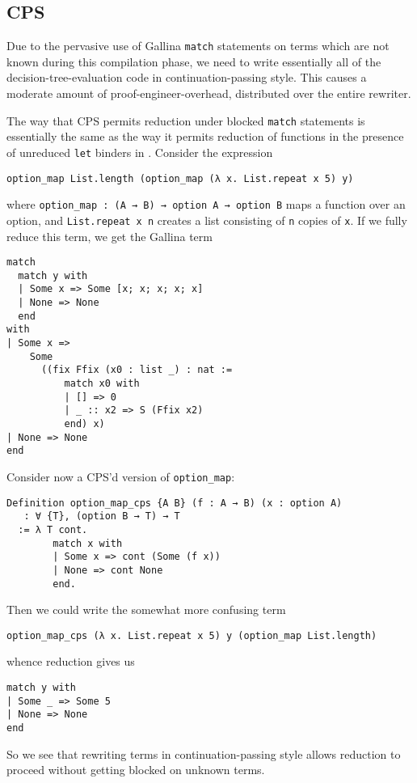 \subsection{CPS}\label{sec:rewriting-more:pre-reduction:cps}
Due to the pervasive use of Gallina \texttt{match} statements on terms which are not known during this compilation phase, we need to write essentially all of the decision-tree-evaluation code in continuation-passing style.
This causes a moderate amount of proof-engineer-overhead, distributed over the entire rewriter.

The way that CPS permits reduction under blocked \texttt{match} statements is essentially the same as the way it permits reduction of functions in the presence of unreduced \texttt{let} binders in .
Consider the expression
\begin{center}
\begin{verbatim}
option_map List.length (option_map (λ x. List.repeat x 5) y)
\end{verbatim}
\end{center}
\noindent
where \texttt{option_map : (A → B) → option A → option B} maps a function over an option, and \texttt{List.repeat x n} creates a list consisting of \texttt{n} copies of \texttt{x}.
If we fully reduce this term, we get the Gallina term
\begin{verbatim}
match
  match y with
  | Some x => Some [x; x; x; x; x]
  | None => None
  end
with
| Some x =>
    Some
      ((fix Ffix (x0 : list _) : nat :=
          match x0 with
          | [] => 0
          | _ :: x2 => S (Ffix x2)
          end) x)
| None => None
end
\end{verbatim}

Consider now a CPS'd version of \texttt{option_map}:
\begin{verbatim}
Definition option_map_cps {A B} (f : A → B) (x : option A)
   : ∀ {T}, (option B → T) → T
  := λ T cont.
        match x with
        | Some x => cont (Some (f x))
        | None => cont None
        end.
\end{verbatim}
\noindent
Then we could write the somewhat more confusing term
\begin{verbatim}
option_map_cps (λ x. List.repeat x 5) y (option_map List.length)
\end{verbatim}
\noindent
whence reduction gives us
\begin{verbatim}
match y with
| Some _ => Some 5
| None => None
end
\end{verbatim}
\noindent
So we see that rewriting terms in continuation-passing style allows reduction to proceed without getting blocked on unknown terms.

